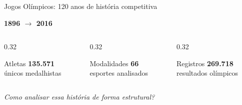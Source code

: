\begin{frame}{Jogos Olímpicos: 120 anos de história competitiva}
    \begin{center}
        \Large
        \textbf{1896 \hspace{0.5cm} $\longrightarrow$ \hspace{0.5cm} 2016}
    \end{center}

    \vspace{0.4cm}

    \begin{columns}[T]
        \begin{column}{0.32\textwidth}
            \begin{block}{\centering Atletas}
                \centering\Large\textbf{135.571}\\
                \footnotesize únicos medalhistas
            \end{block}
        \end{column}
        \begin{column}{0.32\textwidth}
            \begin{block}{\centering Modalidades}
                \centering\Large\textbf{66}\\
                \footnotesize esportes analisados
            \end{block}
        \end{column}
        \begin{column}{0.32\textwidth}
            \begin{block}{\centering Registros}
                \centering\Large\textbf{269.718}\\
                \footnotesize resultados olímpicos
            \end{block}
        \end{column}
    \end{columns}

    \vspace{0.5cm}

    \begin{center}
        \footnotesize
        \textit{Como analisar essa história de forma estrutural?}
    \end{center}
\end{frame}


